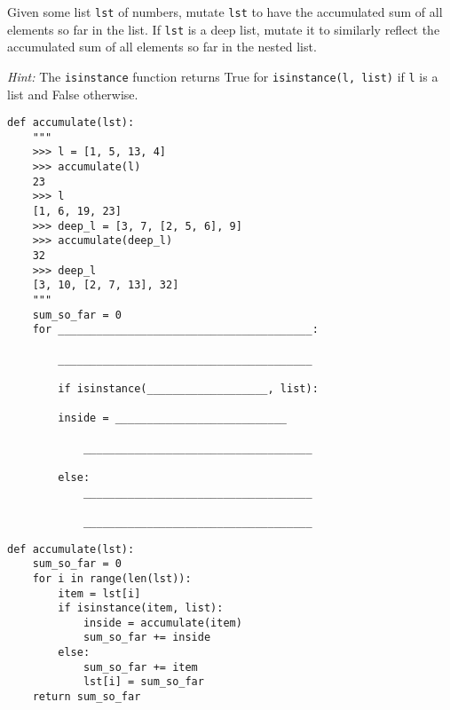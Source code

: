 \begin{blocksection}
\question Given some list \lstinline{lst} of numbers, mutate \lstinline{lst} to have the accumulated sum of all elements so far in the list. If \lstinline{lst} is a deep list, mutate it to similarly reflect the accumulated sum of all elements so far in the nested list. 

\emph{Hint:} The \lstinline$isinstance$ function returns True for \lstinline$isinstance(l, list)$ if \texttt{l} is a list and False otherwise.

\begin{lstlisting}
def accumulate(lst):
    """
    >>> l = [1, 5, 13, 4]
    >>> accumulate(l)
    23
    >>> l
    [1, 6, 19, 23]
    >>> deep_l = [3, 7, [2, 5, 6], 9]
    >>> accumulate(deep_l)
    32
    >>> deep_l
    [3, 10, [2, 7, 13], 32]
    """
    sum_so_far = 0
    for ________________________________________:

	    ________________________________________

        if isinstance(___________________, list):

	    inside = ___________________________

            ____________________________________

        else:
            ____________________________________

            ____________________________________
\end{lstlisting}
\end{blocksection}

\begin{blocksection}
\begin{solution}[1in]
\begin{lstlisting}
def accumulate(lst):
    sum_so_far = 0
    for i in range(len(lst)):
        item = lst[i]
        if isinstance(item, list):
            inside = accumulate(item)
            sum_so_far += inside
        else:
            sum_so_far += item
            lst[i] = sum_so_far
    return sum_so_far
\end{lstlisting}
\end{solution}
\end{blocksection}


